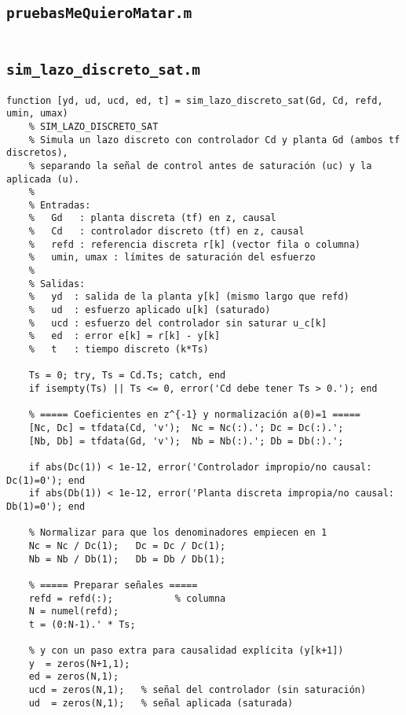 \subsection{\texttt{pruebasMeQuieroMatar.m}}
\begin{lstlisting}[style=matlabstyle,caption={Banco de pruebas y exploración de parámetros.}]
	% === Pegar aquí el contenido de pruebasMeQuieroMatar.m ===
\end{lstlisting}

\subsection{\texttt{sim\_lazo\_discreto\_sat.m}}
\begin{lstlisting}[style=matlabstyle,caption={Simulación de lazo discreto con saturación.}]
	function [yd, ud, ucd, ed, t] = sim_lazo_discreto_sat(Gd, Cd, refd, umin, umax)
	% SIM_LAZO_DISCRETO_SAT
	% Simula un lazo discreto con controlador Cd y planta Gd (ambos tf discretos),
	% separando la señal de control antes de saturación (uc) y la aplicada (u).
	%
	% Entradas:
	%   Gd   : planta discreta (tf) en z, causal
	%   Cd   : controlador discreto (tf) en z, causal
	%   refd : referencia discreta r[k] (vector fila o columna)
	%   umin, umax : límites de saturación del esfuerzo
	%
	% Salidas:
	%   yd  : salida de la planta y[k] (mismo largo que refd)
	%   ud  : esfuerzo aplicado u[k] (saturado)
	%   ucd : esfuerzo del controlador sin saturar u_c[k]
	%   ed  : error e[k] = r[k] - y[k]
	%   t   : tiempo discreto (k*Ts)
	
	Ts = 0; try, Ts = Cd.Ts; catch, end
	if isempty(Ts) || Ts <= 0, error('Cd debe tener Ts > 0.'); end
	
	% ===== Coeficientes en z^{-1} y normalización a(0)=1 =====
	[Nc, Dc] = tfdata(Cd, 'v');  Nc = Nc(:).'; Dc = Dc(:).';
	[Nb, Db] = tfdata(Gd, 'v');  Nb = Nb(:).'; Db = Db(:).';
	
	if abs(Dc(1)) < 1e-12, error('Controlador impropio/no causal: Dc(1)=0'); end
	if abs(Db(1)) < 1e-12, error('Planta discreta impropia/no causal: Db(1)=0'); end
	
	% Normalizar para que los denominadores empiecen en 1
	Nc = Nc / Dc(1);   Dc = Dc / Dc(1);
	Nb = Nb / Db(1);   Db = Db / Db(1);
	
	% ===== Preparar señales =====
	refd = refd(:);           % columna
	N = numel(refd);
	t = (0:N-1).' * Ts;
	
	% y con un paso extra para causalidad explícita (y[k+1])
	y  = zeros(N+1,1);
	ed = zeros(N,1);
	ucd = zeros(N,1);   % señal del controlador (sin saturación)
	ud  = zeros(N,1);   % señal aplicada (saturada)
	

\end{lstlisting}
